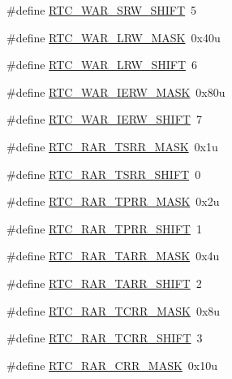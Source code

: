 \begin{DoxyCompactItemize}
\#define \hyperlink{group___r_t_c___register___masks_gadf88a4cb539baab3f26d8a648d45396a}{R\+T\+C\+\_\+\+W\+A\+R\+\_\+\+S\+R\+W\+\_\+\+S\+H\+I\+FT}~5
\item 
\#define \hyperlink{group___r_t_c___register___masks_ga855426b1dfe52e5e72955f19303a7d13}{R\+T\+C\+\_\+\+W\+A\+R\+\_\+\+L\+R\+W\+\_\+\+M\+A\+SK}~0x40u
\item 
\#define \hyperlink{group___r_t_c___register___masks_ga248e25a14d0fa9e2daab759d114331d9}{R\+T\+C\+\_\+\+W\+A\+R\+\_\+\+L\+R\+W\+\_\+\+S\+H\+I\+FT}~6
\item 
\#define \hyperlink{group___r_t_c___register___masks_ga0984de8decd2652e6977bd7f82d6499a}{R\+T\+C\+\_\+\+W\+A\+R\+\_\+\+I\+E\+R\+W\+\_\+\+M\+A\+SK}~0x80u
\item 
\#define \hyperlink{group___r_t_c___register___masks_gab768c19ef066b56a9524098fd049c1f4}{R\+T\+C\+\_\+\+W\+A\+R\+\_\+\+I\+E\+R\+W\+\_\+\+S\+H\+I\+FT}~7
\item 
\#define \hyperlink{group___r_t_c___register___masks_ga0f5e27ed705469977779fdde12c123d1}{R\+T\+C\+\_\+\+R\+A\+R\+\_\+\+T\+S\+R\+R\+\_\+\+M\+A\+SK}~0x1u
\item 
\#define \hyperlink{group___r_t_c___register___masks_ga818fe20844147f1e5844214424365459}{R\+T\+C\+\_\+\+R\+A\+R\+\_\+\+T\+S\+R\+R\+\_\+\+S\+H\+I\+FT}~0
\item 
\#define \hyperlink{group___r_t_c___register___masks_ga24600addfa3bdab90a5c154586725247}{R\+T\+C\+\_\+\+R\+A\+R\+\_\+\+T\+P\+R\+R\+\_\+\+M\+A\+SK}~0x2u
\item 
\#define \hyperlink{group___r_t_c___register___masks_ga822bd340bfb1d1bb31647e665ead6fa2}{R\+T\+C\+\_\+\+R\+A\+R\+\_\+\+T\+P\+R\+R\+\_\+\+S\+H\+I\+FT}~1
\item 
\#define \hyperlink{group___r_t_c___register___masks_ga33ae5982aca9e8f6c95d69127938e30c}{R\+T\+C\+\_\+\+R\+A\+R\+\_\+\+T\+A\+R\+R\+\_\+\+M\+A\+SK}~0x4u
\item 
\#define \hyperlink{group___r_t_c___register___masks_ga65e8ec7e88a1f0583d53c603bdab1615}{R\+T\+C\+\_\+\+R\+A\+R\+\_\+\+T\+A\+R\+R\+\_\+\+S\+H\+I\+FT}~2
\item 
\#define \hyperlink{group___r_t_c___register___masks_gaadb8c80e2d922625e97912b3692b3813}{R\+T\+C\+\_\+\+R\+A\+R\+\_\+\+T\+C\+R\+R\+\_\+\+M\+A\+SK}~0x8u
\item 
\#define \hyperlink{group___r_t_c___register___masks_ga62bf3cee6fc4d16d4ac71912130a72df}{R\+T\+C\+\_\+\+R\+A\+R\+\_\+\+T\+C\+R\+R\+\_\+\+S\+H\+I\+FT}~3
\item 
\#define \hyperlink{group___r_t_c___register___masks_gad35d06502770fe19b836353c9e77c8d1}{R\+T\+C\+\_\+\+R\+A\+R\+\_\+\+C\+R\+R\+\_\+\+M\+A\+SK}~0x10u

\end{DoxyCompactItemize}
